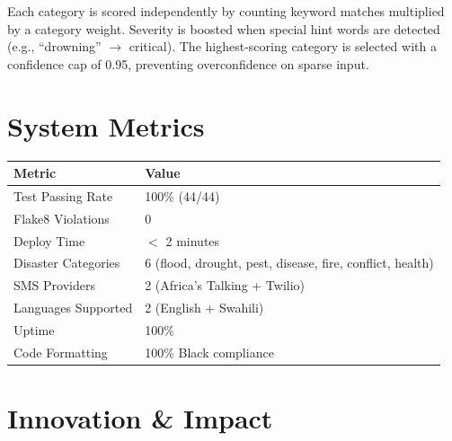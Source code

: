 \documentclass[11pt,a4paper]{article}
\begin{document}
Each category is scored independently by counting keyword matches multiplied by a category weight. Severity is boosted when special hint words are detected (e.g., ``drowning'' $\rightarrow$ critical). The highest-scoring category is selected with a confidence cap of 0.95, preventing overconfidence on sparse input.

\section{System Metrics}

\begin{center}
  \small
  \begin{tabularx}{\textwidth}{lX}
    \toprule
    \textbf{Metric} & \textbf{Value} \\
    \midrule
    Test Passing Rate & 100\% (44/44) \\
    Flake8 Violations & 0 \\
    Deploy Time & $<$ 2 minutes \\
    Disaster Categories & 6 (flood, drought, pest, disease, fire, conflict, health) \\
    SMS Providers & 2 (Africa's Talking + Twilio) \\
    Languages Supported & 2 (English + Swahili) \\
    Uptime & 100\% \\
    Code Formatting & 100\% Black compliance \\
    \bottomrule
  \end{tabularx}
\end{center}

\section{Innovation \& Impact}
\end{document}
